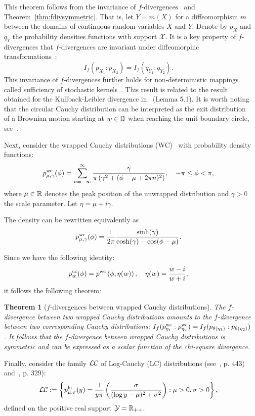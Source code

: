 \documentclass[journal]{IEEEtran}
\newtheorem{theorem}{Theorem}
\begin{document}
This theorem follows from the invariance of $f$-divergences~\cite{IG-2016,EIG-2020} and Theorem~\ref{thm:fdivsymmetric}. 
That is, let $Y=m(X)$ for a diffeomorphism $m$ between the domains of continuous random variables $X$ and $Y$. 
Denote by $p_X$ and $q_Y$ the probability densities functions with support $\mathcal{X}$. 
It is a key property of $f$-divergences that $f$-divergences are invariant under diffeomorphic transformations~\cite{fdivdiffeo-2010,infproj-2021}:
$$
I_f(p_{X_1}:p_{X_2})=I_f(q_{Y_1}:q_{Y_2}).
$$ 
This invariance of $f$-divergences further holds for non-deterministic mappings called sufficiency of stochastic kernels~\cite{liese2006divergences}. 
This result is related to the result obtained for the Kullback-Leibler divergence in~\cite{akaoka2022bahadur} (Lemma 5.1).
It is worth noting that the circular Cauchy distribution can be interpreted as the exit distribution of a Brownian motion starting at $w\in\mathbb{D}$ when reaching the unit boundary circle, see~\cite{mccullagh1992conditional}.



Next, consider the wrapped Cauchy distributions (WC)~\cite{MLE-WrappedCauchy-1988} with probability density functions:
$$
p^{\mathrm{wc}}_{\mu, \gamma}(\phi) = \sum_{n=-\infty}^{\infty} \frac{\gamma}{\pi\left(\gamma^{2}+(\phi-\mu+2 \pi n)^{2}\right)}, \quad -\pi\leq \phi<\pi,
$$
where $\mu\in{\mathbb{R}}$ denotes the peak position of the unwrapped distribution and $\gamma>0$ the scale parameter.
Let $\eta=\mu+i\gamma$.

The density can be rewritten equivalently as
$$
p^{\mathrm{wc}}_{\mu, \gamma}(\phi) = \frac{1}{2 \pi} \frac{\sinh (\gamma)}{\cosh (\gamma)-\cos (\phi-\mu)}.
$$

Since we have the following identity:
$$
p^{\mathrm{cc}}_{w}(\phi)=p^{\mathrm{wc}}\left(\phi, \eta(w)\right),\quad  \eta(w)=\frac{w-i}{w+i}, 
$$
it follows the following theorem:

\begin{theorem}[$f$-divergences between wrapped Cauchy distributions]\label{thm:fdivsymWC}
The $f$-divergence between two wrapped Cauchy distributions amounts to the $f$-divergence between two corresponding Cauchy distributions:
$I_f(p^{\mathrm{wc}}_{\eta_1}:p^{\mathrm{wc}}_{\eta_2})=I_f(p_{\theta(\eta_1)}:p_{\theta(\eta_2)})$.
It follows that the $f$-divergence between wrapped Cauchy distributions is symmetric and can be expressed as a scalar function of the chi-square divergence.
\end{theorem}

Finally, consider the family $\mathcal{LC}$ of Log-Cauchy (LC) distributions (see~\cite{olkin2007life}, p. 443) and~\cite{olive2014statistical}, p. 329):
$$
\mathcal{LC}:=\left\{ p^{\mathrm{lc}}_{\mu,\sigma}(y) =\frac{1}{y \pi}\left(\frac{\sigma}{(\log y-\mu)^{2}+\sigma^{2}}\right) : \mu>0,\sigma>0 \right\},
$$
defined on the positive real support $\mathcal{Y}={\mathbb{R}}_{++}$.
\end{document}

